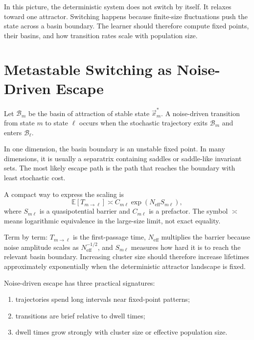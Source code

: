 \noindent In this picture, the deterministic system does not switch by itself. It relaxes toward one attractor. Switching happens because finite-size fluctuations push the state across a basin boundary. The learner should therefore compute fixed points, their basins, and how transition rates scale with population size.

\section{Metastable Switching as Noise-Driven Escape}
\label{sec:metastable-switching-noise-driven-escape}

Let $\mathcal{B}_m$ be the basin of attraction of stable state $\vec x_m^*$. A noise-driven transition from state $m$ to state $\ell$ occurs when the stochastic trajectory exits $\mathcal{B}_m$ and enters $\mathcal{B}_{\ell}$.

In one dimension, the basin boundary is an unstable fixed point. In many dimensions, it is usually a separatrix containing saddles or saddle-like invariant sets. The most likely escape path is the path that reaches the boundary with least stochastic cost.

A compact way to express the scaling is
%
\begin{equation}
  \mathbb{E}[T_{m\to \ell}]
  \asymp
  C_{m\ell}
  \exp\!\left(N_{\mathrm{eff}}S_{m\ell}\right),
  \label{eq:escape-large-deviation}
\end{equation}
%
where $S_{m\ell}$ is a quasipotential barrier and $C_{m\ell}$ is a prefactor. The symbol $\asymp$ means logarithmic equivalence in the large-size limit, not exact equality.

Term by term: $T_{m\to\ell}$ is the first-passage time, $N_{\mathrm{eff}}$ multiplies the barrier because noise amplitude scales as $N_{\mathrm{eff}}^{-1/2}$, and $S_{m\ell}$ measures how hard it is to reach the relevant basin boundary. Increasing cluster size should therefore increase lifetimes approximately exponentially when the deterministic attractor landscape is fixed.

Noise-driven escape has three practical signatures:
%
\begin{enumerate}[leftmargin=*]
  \item trajectories spend long intervals near fixed-point patterns;
  \item transitions are brief relative to dwell times;
  \item dwell times grow strongly with cluster size or effective population size.
\end{enumerate}

